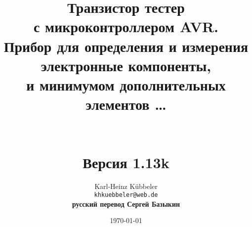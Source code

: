 \documentclass[12pt,a4paper,oneside,english]{report}
\DeclareRobustCommand{\_}{\ifmmode{\rule{1ex}{.4pt}}\else \textunderscore\hspace{0pt}\fi}
\begin{document}
\begin{figure}[t]
\end{figure}
\newcommand\electricC {
\hspace{-12 pt}
\begin{circuitikz}
\draw (0,0) to[capacitor] (0:1);
\end{circuitikz}
\hspace{-6 pt}
}
\newcommand\electricR {
\hspace{-12 pt}
\begin{circuitikz}
\draw (0,0) to[european resistor] (0:1);
\end{circuitikz}
\hspace{-6 pt}
}
\newcommand\electricL {
\hspace{-12 pt}
\begin{circuitikz}
\draw (0,0) 
 to[american inductor] (-1,0) 
;\end{circuitikz}
\hspace{-6 pt}
}
\newcommand\electricDAK {
\begin{circuitikz}
\draw (0,0) to[full diode] (0:1);
\end{circuitikz}
}
\newcommand\electricDKA {
\begin{circuitikz}
\draw (0,0) to[full diode] (180:1);
\end{circuitikz}
}
\title{Транзистор тестер \\
с микроконтроллером AVR.\\
Прибор для определения и измерения \\
электронные компоненты, \\
и минимумом дополнительных элементов \dots \\
~\\
~\\
Версия 1.13k \\
}
\author{Karl-Heinz K\"ubbeler\\
\texttt{kh\_kuebbeler@web.de}\\
\textbf{{\scriptsize русский перевод Сергей Базыкин}}}
\vspace{1cm}
\date{\today}
\maketitle
\tableofcontents




\end{document}
